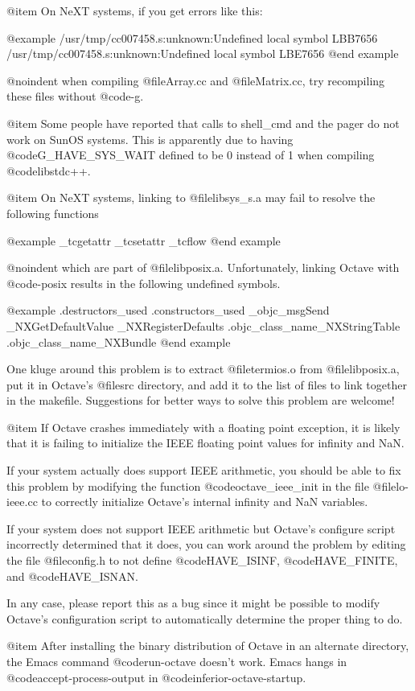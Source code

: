 @item
On NeXT systems, if you get errors like this:

@example
/usr/tmp/cc007458.s:unknown:Undefined local symbol LBB7656
/usr/tmp/cc007458.s:unknown:Undefined local symbol LBE7656
@end example

@noindent
when compiling @file{Array.cc} and @file{Matrix.cc}, try recompiling
these files without @code{-g}.

@item
Some people have reported that calls to shell_cmd and the pager do not
work on SunOS systems.  This is apparently due to having
@code{G_HAVE_SYS_WAIT} defined to be 0 instead of 1 when compiling
@code{libstdc++}.

@item
On NeXT systems, linking to @file{libsys_s.a} may fail to resolve the
following functions

@example
_tcgetattr
_tcsetattr
_tcflow
@end example

@noindent
which are part of @file{libposix.a}.  Unfortunately, linking Octave with
@code{-posix} results in the following undefined symbols.

@example
.destructors_used
.constructors_used
_objc_msgSend
_NXGetDefaultValue
_NXRegisterDefaults
.objc_class_name_NXStringTable
.objc_class_name_NXBundle
@end example

One kluge around this problem is to extract @file{termios.o} from
@file{libposix.a}, put it in Octave's @file{src} directory, and add it
to the list of files to link together in the makefile.  Suggestions for
better ways to solve this problem are welcome!

@item
If Octave crashes immediately with a floating point exception, it is
likely that it is failing to initialize the IEEE floating point values
for infinity and NaN.

If your system actually does support IEEE arithmetic, you should be able
to fix this problem by modifying the function @code{octave_ieee_init} in
the file @file{lo-ieee.cc} to correctly initialize Octave's internal
infinity and NaN variables.

If your system does not support IEEE arithmetic but Octave's configure
script incorrectly determined that it does, you can work around the
problem by editing the file @file{config.h} to not define
@code{HAVE_ISINF}, @code{HAVE_FINITE}, and @code{HAVE_ISNAN}.

In any case, please report this as a bug since it might be possible to
modify Octave's configuration script to automatically determine the
proper thing to do.

@item
After installing the binary distribution of Octave in an alternate
directory, the Emacs command @code{run-octave} doesn't work.  Emacs
hangs in @code{accept-process-output} in @code{inferior-octave-startup}.

